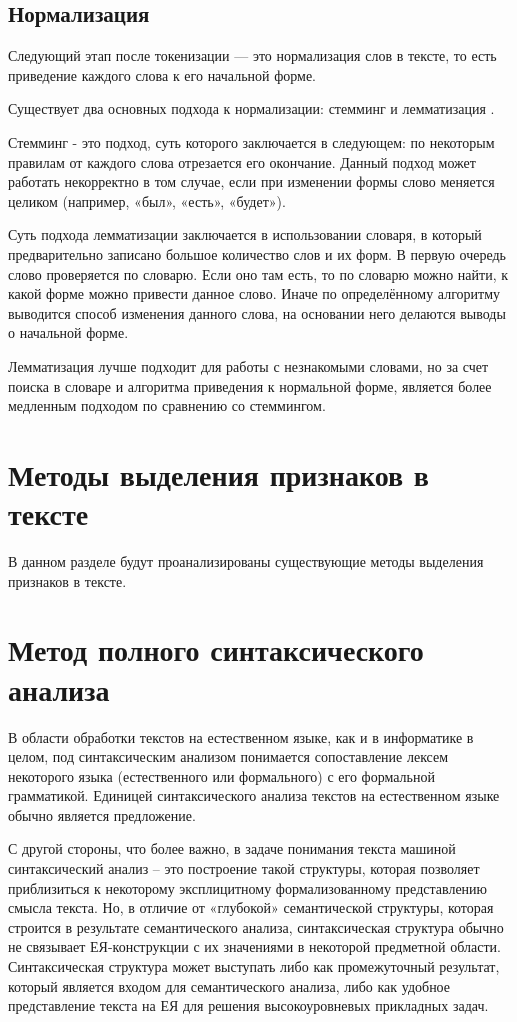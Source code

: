 \subsection{Нормализация}

Следующий этап после токенизации — это нормализация слов в тексте, то есть приведение каждого слова к его начальной форме. 

Существует два основных подхода к нормализации: стемминг и лемматизация  \cite{tutorial}.

Стемминг - это подход, суть которого заключается в следующем: по некоторым правилам от каждого слова отрезается его окончание. Данный подход может работать некорректно в том случае, если при изменении формы слово меняется целиком (например, «был», «есть», «будет»).

Суть подхода лемматизации заключается в  использовании словаря, в который предварительно записано большое количество слов и их форм. В первую очередь слово проверяется по словарю. Если оно там есть, то по словарю можно найти, к какой форме можно привести данное слово. Иначе по определённому алгоритму выводится способ изменения данного слова, на основании него делаются выводы о начальной форме.

Лемматизация лучше подходит для работы с незнакомыми словами, но за счет поиска в словаре и алгоритма приведения к нормальной форме, является более медленным подходом по сравнению со стеммингом.


\section{Методы выделения признаков в тексте}

В данном разделе будут проанализированы существующие методы выделения признаков в тексте.

\section{Метод полного синтаксического анализа}

В области обработки текстов на естественном языке, как и в информатике в целом, под синтаксическим анализом понимается сопоставление лексем некоторого языка (естественного или формального) с его формальной грамматикой. Единицей синтаксического анализа текстов на естественном языке обычно является предложение.

С другой стороны, что более важно, в задаче понимания текста машиной синтаксический анализ – это построение такой структуры, которая позволяет приблизиться к некоторому эксплицитному формализованному представлению смысла текста. Но, в отличие от «глубокой» семантической структуры, которая строится в результате семантического анализа, синтаксическая структура обычно не связывает ЕЯ-конструкции с их значениями в некоторой предметной области. Синтаксическая структура может выступать либо как промежуточный результат, который является входом для семантического анализа, либо как удобное представление текста на ЕЯ для решения высокоуровневых прикладных задач.

